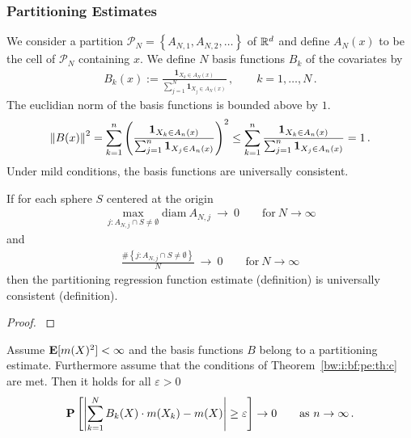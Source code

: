 \subsubsection*{Partitioning Estimates}
We consider a partition
$
  \mathcal{P}_N
  =
  \left\{ 
    A_{N,1}
    ,
    A_{N,2}
    ,
    \ldots
  \right\}
$
of $ \mathbb{R}^d $
and define
$ A_N(x) $ to be the cell of $ \mathcal{P}_N $ containing $x$.
We define $N$ basis functions $B_k$ of the covariates by
\begin{gather*}
  B_k(x)
  :=
  \frac{
  \mathbf{1}_{X_k \in A_N(x)}
  }{
  \sum_{j=1}^{N} 
  \mathbf{1}_{X_j \in A_N(x)}
  }
  \,,
  \qquad
  k=
  1,\ldots,N
  \,.
\end{gather*}
The euclidian norm of the basis functions is bounded above by $1$.
\begin{gather*}
  \left\lVert B(x)\right\rVert^2
  =
  \sum_{k=1}^{n} 
  \left( 
  \frac{
  \mathbf{1}_{X_k \in A_n(x)}
  }{
  \sum_{j=1}^{n} 
  \mathbf{1}_{X_j \in A_n(x)}
  }
  \right)
  ^2
  \le
  \sum_{k=1}^{n} 
  \frac{
  \mathbf{1}_{X_k \in A_n(x)}
  }{
  \sum_{j=1}^{n} 
  \mathbf{1}_{X_j \in A_n(x)}
  }
  =1
  \,.
\end{gather*}
Under mild conditions, the basis functions are universally consistent.
\begin{theorem}
  \label{bw:i:bf:pe:th:c}
  If for each sphere $S$ centered at the origin 
  \begin{gather}
    \max
    _
    {
      j\colon
      A_{N,j} 
      \cap
      S
      \neq
      \emptyset
    }
    \mathrm{diam}
    \ 
      A_{N,j} 
      \ 
      \to
      \ 
      0
      \qquad
      \text{for}\ 
      N\to \infty 
  \end{gather}
  and
  \begin{gather}
    \frac
    {
    \#
    \left\{  
      j\colon
      A_{N,j} 
      \cap
      S
      \neq
      \emptyset
    \right\}
    }
    {N}
      \ 
      \to
      \ 
      0
      \qquad
      \text{for}\ 
      N\to \infty 
  \end{gather}
  then the partitioning regression function estimate 
  (definition)
  is
  universally consistent (definition).
\end{theorem}
\begin{proof}
  \cite[Theorem~4.2.]{Gyorfi2002}
\end{proof}
\begin{corollary}
Assume
  $\mathbf{E}[m(X)^2]<\infty$
  and the basis functions $B$ belong to a partitioning estimate.
  Furthermore assume that the conditions of 
  Theorem~\ref{bw:i:bf:pe:th:c} are met.
Then it holds for all $\varepsilon>0$
\begin{gather}
  \P
  \left[ 
    \left| 
    \sum_{k=1}^{N} 
    B_k(X)
    \cdot
    m(X_k)
    -
    m(X)
    \right|
    \ge
    \varepsilon
  \right]
  \to
  0
  \qquad
  \text{as}
  \ 
  n\to \infty
  \,.
\end{gather}

\end{corollary}
